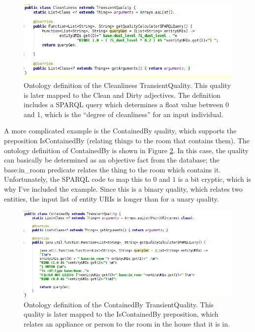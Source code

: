 \documentclass[titlepage]{article}
\begin{document}
\begin{figure}[h!]
\centering
\includegraphics[width=\textwidth]{CleanlinessQuality}
\caption{Ontology definition of the Cleanliness TransientQuality.
This quality is later mapped to the Clean and Dirty adjectives.
The definition includes a SPARQL query which determines a float value between 0 and 1, which is the ``degree of cleanliness'' for an input individual.}
\label{fig:cleanliness_quality}
\end{figure}


A more complicated example is the ContainedBy quality, which supports the preposition IsContainedBy (relating things to the room that contains them).
The ontology definition of ContainedBy is shown in Figure \ref{fig:contained_by}.
In this case, the quality can basically be determined as an objective fact from the database; the base:in\_room predicate relates the thing to the room which contains it.
Unfortunately, the SPARQL code to map this to $0$ and $1$ is a bit cryptic, which is why I've included the example.
Since this is a binary quality, which relates two entities, the input list of entity URIs is longer than for a unary quality.\\

\begin{figure}[h!]
\centering
\includegraphics[width=\textwidth]{ContainedByQuality}
\caption{Ontology definition of the ContainedBy TransientQuality.
This quality is later mapped to the IsContainedBy preposition, which relates an appliance or person to the room in the house that it is in.}
\label{fig:contained_by}
\end{figure}
\end{document}
